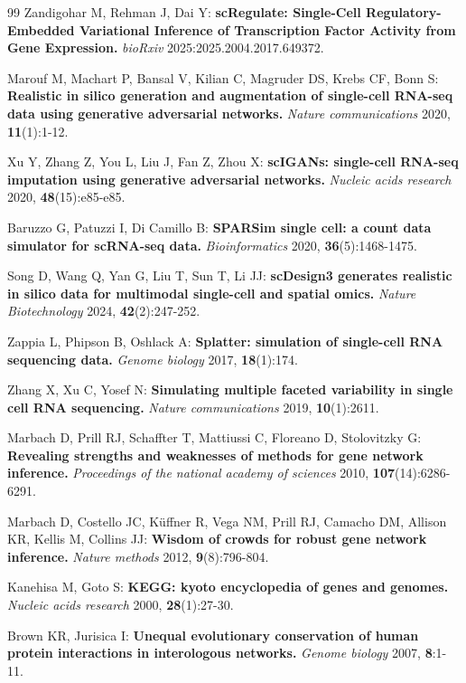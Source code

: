 \begin{tcolorbox}
\begin{singlespace}
\begin{thebibliography}{99\kern\bibindent}
Zandigohar M, Rehman J, Dai Y: \textbf{scRegulate: Single-Cell Regulatory-Embedded Variational Inference of Transcription Factor Activity from Gene Expression.} \textit{bioRxiv} 2025:2025.2004.2017.649372.

Marouf M, Machart P, Bansal V, Kilian C, Magruder DS, Krebs CF, Bonn S: \textbf{Realistic in silico generation and augmentation of single-cell RNA-seq data using generative adversarial networks.} \textit{Nature communications} 2020, \textbf{11}(1):1-12.

Xu Y, Zhang Z, You L, Liu J, Fan Z, Zhou X: \textbf{scIGANs: single-cell RNA-seq imputation using generative adversarial networks.} \textit{Nucleic acids research} 2020, \textbf{48}(15):e85-e85.

Baruzzo G, Patuzzi I, Di Camillo B: \textbf{SPARSim single cell: a count data simulator for scRNA-seq data.} \textit{Bioinformatics} 2020, \textbf{36}(5):1468-1475.

Song D, Wang Q, Yan G, Liu T, Sun T, Li JJ: \textbf{scDesign3 generates realistic in silico data for multimodal single-cell and spatial omics.} \textit{Nature Biotechnology} 2024, \textbf{42}(2):247-252.

Zappia L, Phipson B, Oshlack A: \textbf{Splatter: simulation of single-cell RNA sequencing data.} \textit{Genome biology} 2017, \textbf{18}(1):174.

Zhang X, Xu C, Yosef N: \textbf{Simulating multiple faceted variability in single cell RNA sequencing.} \textit{Nature communications} 2019, \textbf{10}(1):2611.

Marbach D, Prill RJ, Schaffter T, Mattiussi C, Floreano D, Stolovitzky G: \textbf{Revealing strengths and weaknesses of methods for gene network inference.} \textit{Proceedings of the national academy of sciences} 2010, \textbf{107}(14):6286-6291.

Marbach D, Costello JC, Küffner R, Vega NM, Prill RJ, Camacho DM, Allison KR, Kellis M, Collins JJ: \textbf{Wisdom of crowds for robust gene network inference.} \textit{Nature methods} 2012, \textbf{9}(8):796-804.

Kanehisa M, Goto S: \textbf{KEGG: kyoto encyclopedia of genes and genomes.} \textit{Nucleic acids research} 2000, \textbf{28}(1):27-30.

Brown KR, Jurisica I: \textbf{Unequal evolutionary conservation of human protein interactions in interologous networks.} \textit{Genome biology} 2007, \textbf{8}:1-11.


\end{thebibliography}
\end{singlespace}
\end{tcolorbox}

